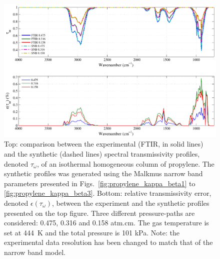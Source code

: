 \begin{figure}[p]
\includegraphics[width=\textwidth]{Figures/Comparison_Fit_Propylene_MALKMUS_Temp444K.pdf}
\caption{Top: comparison between the experimental (FTIR, in solid lines) and the synthetic (dashed lines) spectral transmissivity profiles, denoted $\tau_{\omega}$, of an isothermal homogeneous column of propylene. The synthetic profiles was generated using the Malkmus narrow band parameters presented in Figs.~\ref{fig:propylene_kappa_beta1} to \ref{fig:propylene_kappa_beta3}. Bottom: relative transmissivity error, denoted $\epsilon{(\tau_{\omega})}$, between the experiment and the synthetic profiles presented on the top figure. Three different pressure-paths are considered: 0.475, 0.316 and 0.158 atm.cm. The gas temperature is set at 444~K and the total pressure is 101 kPa. Note: the experimental data resolution has been changed to match that of the narrow band model. \label{fig:propylene_SNBVerify_444K}}
\end{figure}

